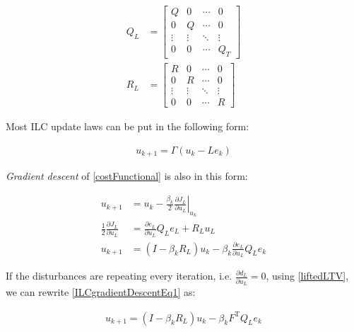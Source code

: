 \documentclass[10pt,a4paper]{article}
\newcommand\at[2]{\left.#1\right|_{#2}} %
\newcommand{\error}{e} %
\newcommand{\linDist}{d} %
\newcommand{\sysInput}{u} %
\newcommand{\qmatrix}{\Gamma} %
\newcommand{\lmatrix}{L} %
\newcommand{\ValueFunction}{J}
\begin{document}
\begin{equation*}
\begin{aligned}
 Q_L &= 
 \begin{bmatrix}
  Q & 0 & \cdots & 0 \\
  0 & Q & \cdots & 0 \\
  \vdots  & \vdots  & \ddots & \vdots  \\
  0 & 0 & \cdots & Q_T
 \end{bmatrix} \\
 R_L &= 
  \begin{bmatrix}
   R & 0 & \cdots & 0 \\
   0 & R & \cdots & 0 \\
   \vdots  & \vdots  & \ddots & \vdots  \\
   0 & 0 & \cdots & R
  \end{bmatrix}
\end{aligned}
\end{equation*}

Most ILC update laws can be put in the following form:

\begin{equation}
\begin{aligned}
\sysInput_{k+1} = \qmatrix(\sysInput_{k} - \lmatrix\error_{k})
\end{aligned}
\label{ILCupdateForm}
\end{equation}

\emph{Gradient descent} of \eqref{costFunctional} is also in this form:

\begin{equation}
\begin{aligned}
\sysInput_{k+1} &= \sysInput_k - \frac{\beta_k}{2} \at{\frac{\partial{\ValueFunction_L}}{\partial{\sysInput_L}}}{\sysInput_k} \\
\frac{1}{2}\frac{\partial{\ValueFunction_L}}{\partial{\sysInput_L}} &= \frac{\partial{\error_L}}{\partial{\sysInput_L}}Q_L\error_L + R_L\sysInput_L \\
\sysInput_{k+1} &= (I - \beta_kR_L)\sysInput_k - \beta_k\frac{\partial{\error_L}}{\partial{\sysInput_L}}Q_L\error_k
\end{aligned}
\label{ILCgradientDescentEq1}
\end{equation}

If the disturbances are repeating every iteration, i.e. $\frac{\partial{\linDist_L}}{\partial{\sysInput_L}} = 0$, using \eqref{liftedLTV}, we can rewrite \eqref{ILCgradientDescentEq1} as:

\begin{equation}
\begin{aligned}
\sysInput_{k+1} = (I - \beta_kR_L)\sysInput_k - \beta_kF^\mathrm{T}Q_L\error_k
\end{aligned}
\label{ILCgradientDescentEq2}
\end{equation}
\end{document}
